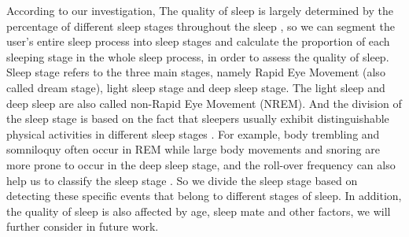 According to our investigation, The quality of sleep is largely determined by the percentage of different sleep stages throughout the sleep
\cite{iSleep,gu2016sleep}, so we can segment the user's entire sleep process into sleep stages and calculate the proportion of each
sleeping stage in the whole sleep process, in order to assess the quality of sleep.  Sleep stage refers to the three main stages, namely
Rapid Eye Movement (also called dream stage), light sleep stage and deep sleep stage. The light sleep and deep sleep are also called
non-Rapid Eye Movement (NREM). And the division of the sleep stage is based on the fact that sleepers usually exhibit distinguishable
physical activities in different sleep stages \cite{ancoli2003role}. For example, body trembling and somniloquy often occur in REM while
large body movements and snoring are more prone to occur in the deep sleep stage, and the roll-over frequency can also help us to classify
the sleep stage \cite{rollover2007}. So we divide the sleep stage based on detecting these specific events  that belong to different stages
of sleep. In addition, the quality of sleep is also affected by age, sleep mate and other factors, we will further consider in future work.
